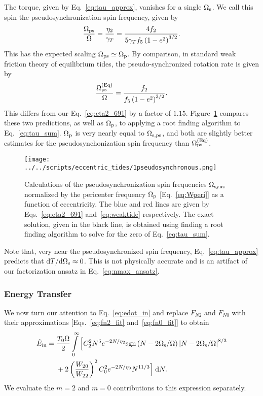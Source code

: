 \documentclass[
        fleqn,
        usenatbib,
    ]{mnras}
\newcommand*{\rdil}[2]{\mathrm{d}#1 / \mathrm{d}#2}
\newcommand*{\p}[1]{\left(#1\right)}
\begin{document}
The torque, given by Eq.~\eqref{eq:tau_approx}, vanishes for a single
$\Omega_{\rm s}$. We call this spin the pseudosynchronization
spin frequency, given by
\begin{equation}
    \frac{\Omega_{\rm ps}}{\Omega} =
        \frac{\eta_2}{\gamma_T} = \frac{4f_2}{5\gamma_T f_5\p{1 -
        e^2}^{3/2}}.\label{eq:eta2_691}
\end{equation}
This has the expected scaling $\Omega_{\rm ps} \simeq \Omega_{\rm p}$. By
comparison, in standard weak friction theory of equilibrium tides, the
pseudo-synchronized rotation rate is given by
\citep{alexander73, hut81}
\begin{equation}
    \frac{\Omega_{\rm ps}^{\rm (Eq)}}{\Omega} = \frac{f_2}{f_5\p{1 -
        e^2}^{3/2}}.\label{eq:weaktide}
\end{equation}
This differs from our Eq.~\eqref{eq:eta2_691} by a factor of $1.15$.
Figure~\ref{fig:pseudosync} compares these two predictions, as well as
$\Omega_{\rm p}$, to applying a root finding algorithm to
Eq.~\eqref{eq:tau_sum}. $\Omega_{\rm p}$ is very nearly equal to $\Omega_{\rm s,
ps}$, and both are slightly better estimates for the pseudosynchonization spin
frequency than $\Omega_{\rm ps}^{\rm (Eq)}$.
\begin{figure}
    \centering
    \texttt{[image: ../../scripts/eccentric\_tides/1pseudosynchronous.png]}
    \caption{Calculations of the pseudosynchronization spin frequencies
    $\Omega_{\rm sync}$ normalized by the pericenter frequency $\Omega_{\rm p}$
    [Eq.~\eqref{eq:Wperi}] as a function of eccentricity. The blue and red lines
    are given by Eqs.~\eqref{eq:eta2_691} and~\eqref{eq:weaktide} respectively.
    The exact solution, given in the black line, is obtained using finding a
    root finding algorithm to solve for the zero of Eq.~\eqref{eq:tau_sum}.
    }\label{fig:pseudosync}
\end{figure}

Note that, very near the pseudosynchronized spin frequency,
Eq.~\eqref{eq:tau_approx} predicts that $\rdil{T}{\Omega_{\rm s}} \approx 0$.
This is not physically accurate and is an artifact of our factorization ansatz
in Eq.~\eqref{eq:nmax_ansatz}.

\subsubsection{Energy Transfer}

We now turn our attention to Eq.~\eqref{eq:edot_in} and replace $F_{N2}$ and
$F_{N0}$ with their approximations [Eqs.~\eqref{eq:fn2_fit}
and~\eqref{eq:fn0_fit}] to obtain
\begin{align}
    \dot{E}_{\rm in} ={}&
        \frac{T_0 \Omega}{2} \int\limits_0^\infty \Big[
            C_2^2 N^5 e^{-2N/\eta_2} \mathrm{sgn}\left(N - 2\Omega_{\rm s} /
                \Omega\right) \left|N - 2 \Omega_{\rm s} /
                \Omega\right|^{8/3}\nonumber\\
            &+ 2 \p{\frac{W_{20}}{W_{22}}}^2 C_0^2 e^{-2N / \eta_0} N^{11/3}
        \Big]\;\mathrm{d}N.\label{eq:ein_int}
\end{align}
We evaluate the $m = 2$ and $m = 0$ contributions to this expression separately.
\end{document}
